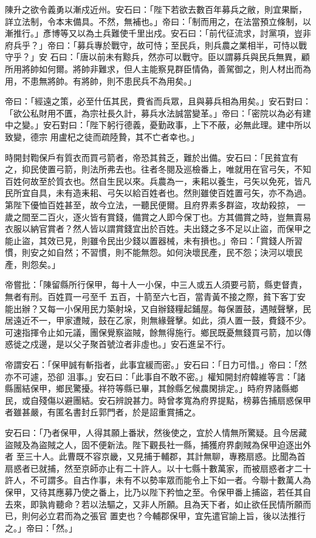 \begin{pinyinscope}
 陳升之欲令義勇以漸戍近州。安石曰：「陛下若欲去數百年募兵之敝，則宜果斷，詳立法制，令本末備具。不然，無補也。」帝曰：「制而用之，在法當預立條制，以漸推行。」彥博等又以為土兵難使千里出戍。安石曰：「前代征流求，討黨項，豈非府兵乎？」帝曰：「募兵專於戰守，故可恃；至民兵，則兵農之業相半，可恃以戰守乎？」安
 石曰：「唐以前未有黥兵，然亦可以戰守。臣以謂募兵與民兵無異，顧所用將帥如何爾。將帥非難求，但人主能察見群臣情偽，善駕御之，則人材出而為用，不患無將帥。有將帥，則不患民兵不為用矣。」



 帝曰：「經遠之策，必至什伍其民，費省而兵眾，且與募兵相為用矣。」安石對曰：「欲公私財用不匱，為宗社長久計，募兵水法誠當變革。」帝曰：「密院以為必有建中之變。」安石對曰：「陛下躬行德義，憂勤政事，上下不蔽，必無此理。建中所以致變，德宗
 用盧杞之徒而疏陸贄，其不亡者幸也。」



 時開封鞫保戶有質衣而買弓箭者，帝恐其貧乏，難於出備。安石曰：「民貧宜有之，抑民使置弓箭，則法所弗去也。往者冬閱及巡檢番上，唯就用在官弓矢，不知百姓何故至於質衣也。然自生民以來。兵農為一，耒耜以養生，弓矢以免死，皆凡民所宜自具，未有造耒耜、弓矢以給百姓者也。然則雖使百姓置弓矢，亦不為過。第陛下優恤百姓甚至，故今立法，一聽民便爾。且府界素多群盜，攻劫殺掠，
 一歲之間至二百火，逐火皆有賞錢，備賞之人即今保丁也。方其備賞之時，豈無賣易衣服以納官賞者？然人皆以謂賞錢宜出於百姓。夫出錢之多不足以止盜，而保甲之能止盜，其效已見，則雖令民出少錢以置器械，未有損也。」帝曰：「賞錢人所習慣，則安之如自然；不習慣，則不能無怨。如何決壞民產，民不怨；決河以壞民產，則怨矣。」



 帝嘗批：「陳留縣所行保甲，每十人一小保，中三人或五人須要弓箭，縣吏督責，無者有刑。百姓買一弓至千
 五百，十箭至六七百，當青黃不接之際，貧下客丁安能出辦？又每一小保用民力築射垛，又自辦錢糧起鋪屋。每保置鼓，遇賊聲擊，民居遠近不一，甲家遭賊，鼓在乙家，則無緣聲擊。如此，須人置一鼓，費錢不少。可速指揮令止如元議，團保覺察盜賊，餘無得施行。鄉民既憂無錢買弓箭，加以傳惑徙之戍邊，是以父子聚首號泣者非虛也。」安石進呈不行。



 帝謂安石：「保甲誠有斬指者，此事宜緩而密。」安石曰：「日力可惜。」帝曰：「然亦不可遽，恐卻
 沮事。」安石曰：「此事自不敢不密。」權知開封府韓維等言：「諸縣團結保甲，鄉民驚擾。祥符等縣已畢，其餘縣乞候農閑排定。」時府界諸縣鄉民，或自殘傷以避團結。安石辨說甚力。時曾孝寬為府界提點，榜募告捕扇惑保甲者雖甚嚴，有匿名書封丘郭門者，於是詔重賞捕之。



 安石曰：「乃者保甲，人得其願上番狀，然後使之，宜於人情無所驚疑。且今居藏盜賊及為盜賊之人，固不便新法。陛下觀長社一縣，捕獲府界劇賊為保甲迫逐出外者
 至三十人。此曹既不容京畿，又見捕于輔郡，其計無聊，專務扇惑。比聞為首扇惑者已就捕，然至京師亦止有二十許人。以十七縣十數萬家，而被扇惑者才二十許人，不可謂多。自古作事，未有不以勢率眾而能令上下如一者。今聯十數萬人為保甲，又待其應募乃使之番上，比乃以陛下矜恤之至。令保甲番上捕盜，若任其自去來，即孰肯聽命？若以法驅之，又非人所願。且為天下者，如止欲任民情所願而已，則何必立君而為之張官
 置吏也？今輔郡保甲，宜先遣官諭上旨，後以法推行之。」帝曰：「然。」




\end{pinyinscope}
